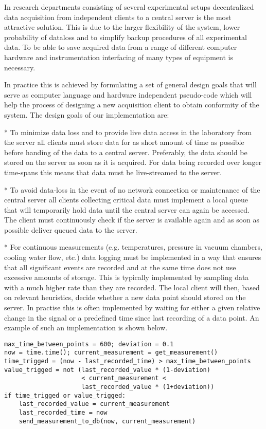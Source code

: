 In research departments consisting of several experimental setups decentralized
data acquisition from independent clients to a central server is the most
attractive solution. This is due to the larger flexibility of the system, lower
probability of dataloss and to simplify backup procedures of all experimental
data. To be able to save acquired data from a range of different computer
hardware and instrumentation interfacing of many types of equipment is
necessary.

In practice this is achieved by formulating a set of general design goals that
will serve as computer language and hardware independent pseudo-code which will
help the process of designing a new acquisition client to obtain conformity of
the system. The design goals of our implementation are:

* To minimize data loss and to provide live data access in the laboratory
  from the server all clients must store data for as short amount of time as
  possible before handing of the data to a central server. Preferably, the data
  should be stored on the server as soon as it is acquired. For data being
  recorded over longer time-spans this means that data must be live-streamed to
  the server.

* To avoid data-loss in the event of no network connection or maintenance
  of the central server all clients collecting critical data must implement a
  local queue that will temporarily hold data until the central server can
  again be accessed. The client must continuously check if the server is
  available again and as soon as possible deliver queued data to the server.

* For continuous measurements (e.g. temperatures, pressure in vacuum chambers,
  cooling water flow, etc.) data logging must be implemented in a way that
  ensures that all significant events are recorded and at the same time does
  not use excessive amounts of storage. This is typically implemented by
  sampling data with a much higher rate than they are recorded. The local
  client will then, based on relevant heuristics, decide whether a new data
  point should stored on the server. In practise this is often implemented by
  waiting for either a given relative change in the signal or a predefined time
  since last recording of a data point. An example of such an implementation is
  shown below.

\begin{verbatim}
max_time_between_points = 600; deviation = 0.1
now = time.time(); current_measurement = get_measurement()
time_trigged = (now - last_recorded_time) > max_time_between_points
value_trigged = not (last_recorded_value * (1-deviation)
                     < current_measurement <
                     last_recorded_value * (1+deviation))
if time_trigged or value_trigged:
    last_recorded_value = current_measurement
    last_recorded_time = now
    send_measurement_to_db(now, current_measurement)
\end{verbatim}
  
